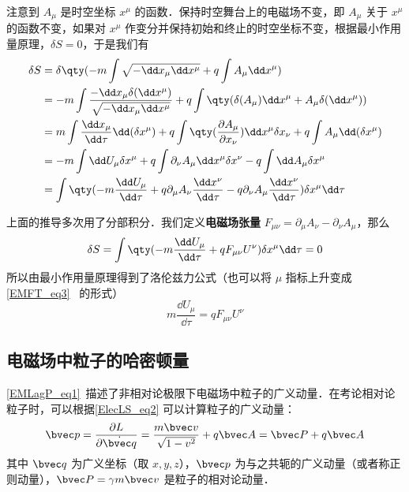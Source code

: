 注意到 $A_\mu$ 是时空坐标 $x^\mu$ 的函数．保持时空舞台上的电磁场不变，即 $A_\mu$ 关于 $x^\mu$ 的函数不变，如果对 $x^\mu$ 作变分并保持初始和终止的时空坐标不变，根据最小作用量原理，$\delta S=0$，于是我们有
\begin{equation}
\begin{aligned}
\delta S&=\delta\qty( -m\int \sqrt{-\dd x_\mu \dd x^\mu} +q\int A_\mu \dd x^\mu)\\
&=-m\int \frac{-\dd x_\mu \delta (\dd x^\mu)}{\sqrt{-\dd x_\mu \dd x^\mu}}+q\int \qty(\delta(A_\mu)\dd x^\mu + A_\mu \delta(\dd x^\mu))\\
&=m\int \frac{\dd x_\mu}{\dd \tau}\dd(\delta x^\mu)+q\int\qty(\frac{\partial A_\mu}{\partial x_\nu})\dd x^\mu \delta x_\nu+q\int A_\mu \dd(\delta x^\mu)\\
&=-m\int\dd U_\mu \delta x^\mu+q\int \partial_\nu A_\mu \dd x^\mu\delta x^\nu-q\int \dd A_\mu \delta x^\mu\\
&=\int \qty(-m\frac{\dd U_\mu}{\dd \tau} + q\partial_\mu A_\nu \frac{\dd x^\nu}{\dd \tau}-q\partial_\nu A_\mu\frac{\dd x^\nu}{\dd \tau})\delta x^\mu\dd \tau\\
\end{aligned}
\end{equation}

上面的推导多次用了分部积分．我们定义\textbf{电磁场张量} $F_{\mu\nu}=\partial_{\mu}A_\nu-\partial_\nu A_\mu$，那么
\begin{equation}
\delta S=\int\qty(-m\frac{\dd U_\mu}{\dd \tau}+qF_{\mu\nu}U^\nu)\delta x^\mu \dd \tau=0
\end{equation}
所以由最小作用量原理得到了洛伦兹力公式（也可以将 $\mu$ 指标上升变成 \autoref{EMFT_eq3}~ 的形式）
\begin{equation}
m\frac{\dd U_\mu}{\dd \tau}=qF_{\mu\nu} U^\nu
\end{equation}
\subsection{电磁场中粒子的哈密顿量}
\autoref{EMLagP_eq1}~描述了非相对论极限下电磁场中粒子的广义动量．在考论相对论粒子时，可以根据\autoref{ElecLS_eq2} 可以计算粒子的广义动量：
\begin{equation}
\bvec p=\frac{\partial L}{\partial \dot {\bvec q}}=\frac{m\bvec v}{\sqrt{1-v^2}}+q\bvec A=\bvec P+q\bvec A
\end{equation}
其中 $\bvec q$ 为广义坐标（取 $x,y,z$），$\bvec p$ 为与之共轭的广义动量（或者称正则动量），$\bvec P=\gamma m\bvec v$ 是粒子的相对论动量．

